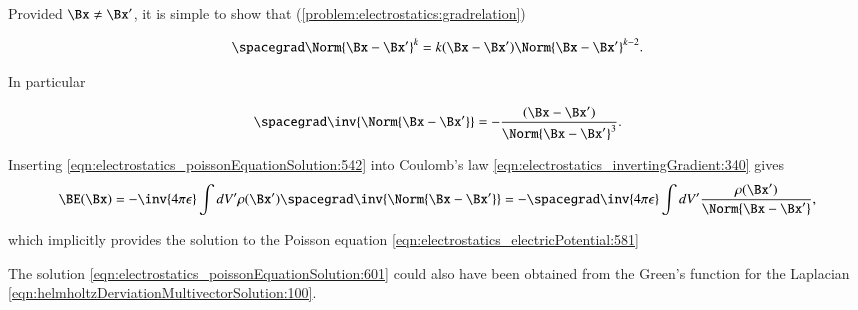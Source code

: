 %
%
Provided \( \Bx \ne \Bx' \), it is simple to show that (\cref{problem:electrostatics:gradrelation})

\begin{dmath}\label{eqn:electrostatics_poissonEquationSolution:541}
\spacegrad \Norm{\Bx - \Bx'}^k = k (\Bx - \Bx') \Norm{ \Bx - \Bx' }^{k-2}.
\end{dmath}

In particular

\begin{dmath}\label{eqn:electrostatics_poissonEquationSolution:542}
\spacegrad \inv{\Norm{\Bx - \Bx'}} = - \frac{(\Bx - \Bx')}{\Norm{ \Bx - \Bx' }^{3}}.
\end{dmath}

Inserting \cref{eqn:electrostatics_poissonEquationSolution:542} into Coulomb's law \cref{eqn:electrostatics_invertingGradient:340} gives
\begin{dmath}\label{eqn:electrostatics_poissonEquationSolution:661}
\BE(\Bx)
=
-\inv{4 \pi \epsilon} \int dV' \rho(\Bx') \spacegrad \inv{\Norm{\Bx - \Bx'}}
=
- \spacegrad \inv{4 \pi \epsilon} \int dV' \frac{\rho(\Bx')}{\Norm{\Bx - \Bx'}},
\end{dmath}

which implicitly provides the solution to the Poisson equation \cref{eqn:electrostatics_electricPotential:581}


The solution \cref{eqn:electrostatics_poissonEquationSolution:601} could also have been obtained from the Green's function for the Laplacian
\cref{eqn:helmholtzDerviationMultivectorSolution:100}.
